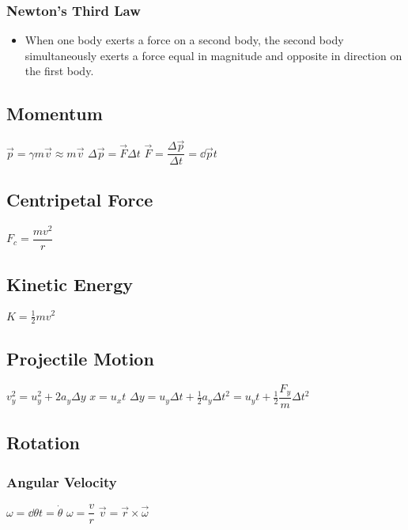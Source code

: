 \subsubsection{Newton's Third Law}
\begin{itemize}
\itemt \(\vec{F}_A = -\vec{F}_B	\) 
\item When one body exerts a force on a second body, the second body simultaneously exerts a force equal in magnitude and opposite in direction on the first body.
\end{itemize}			

\subsection{Momentum}
\begin{itemize}
\itemt \( \vec{p} = \gamma m\vec{v} \approx m\vec{v}\)
\itemt \( \Delta\vec{p} = \vec{F} \Delta t \)
\itemt \(\vec{F} = \dfrac{\Delta \vec{p}}{\Delta t} = \dd{\vec{p}}{t} \)
\end{itemize}

\subsection{Centripetal Force}
\begin{itemize}
\itemt \(F_c = \dfrac{mv^2}{r}\)
\end{itemize}		

\subsection{Kinetic Energy}	
\begin{itemize}
\itemt \( K = \frac{1}{2} mv^2 \)
\end{itemize}

\subsection{Projectile Motion}		
\begin{itemize}
\itemt \(v_y^2 = u_y^2 + 2a_y\Delta y \)
\itemt \( x = u_xt \)
\itemt \(\Delta y = u_y \Delta t + \frac{1}{2} a_y \Delta t^2 = u_y t + \frac{1}{2} \dfrac{F_{y}}{m} \Delta t^2\)
\end{itemize}	


\subsection{Rotation}

\subsubsection{Angular Velocity}
\begin{itemize}
\itemt \( \omega = \dd{\theta}{t} = \dot{\theta} \)
\itemt \( \omega = \dfrac{v}{r} \)
\itemt \( \vec{v} = \vec{r} \times \vec{\omega} \)
\end{itemize}

